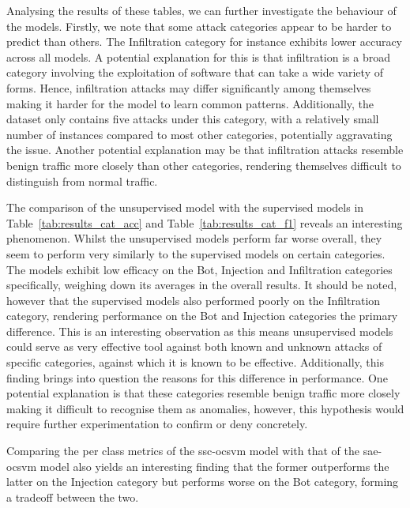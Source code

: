 Analysing the results of these tables, we can further investigate the behaviour
of the models. Firstly, we note that some attack categories appear to be harder
to predict than others. The Infiltration category for instance exhibits lower
accuracy across all models. A potential explanation for this is that
infiltration is a broad category involving the exploitation of software that
can take a wide variety of forms. Hence, infiltration attacks may differ
significantly among themselves making it harder for the model to learn common
patterns. Additionally, the dataset only contains five attacks under this
category, with a relatively small number of instances compared to most other
categories, potentially aggravating the issue. Another potential explanation
may be that infiltration attacks resemble benign traffic more closely than
other categories, rendering themselves difficult to distinguish from normal
traffic.

The comparison of the unsupervised model with the supervised models in
Table~\ref{tab:results_cat_acc} and Table~\ref{tab:results_cat_f1} reveals an
interesting phenomenon. Whilst the unsupervised models perform far worse
overall, they seem to perform very similarly to the supervised models on
certain categories. The models exhibit low efficacy on the Bot, Injection and
Infiltration categories specifically, weighing down its averages in the overall
results. It should be noted, however that the supervised models also
performed poorly on the Infiltration category, rendering performance on the Bot
and Injection categories the primary difference. This is an interesting
observation as this means unsupervised models could serve as very effective
tool against both known and unknown attacks of specific categories, against
which it is known to be effective. Additionally, this finding brings into
question the reasons for this difference in performance. One potential
explanation is that these categories resemble benign traffic more closely
making it difficult to recognise them as anomalies, however, this hypothesis
would require further experimentation to confirm or deny concretely.

Comparing the per class metrics of the \gls{ssc}-\gls{ocsvm} model with that of
the \gls{sae}-\gls{ocsvm} model also yields an interesting finding that the
former outperforms the latter on the Injection category but performs worse on
the Bot category, forming a tradeoff between the two.

